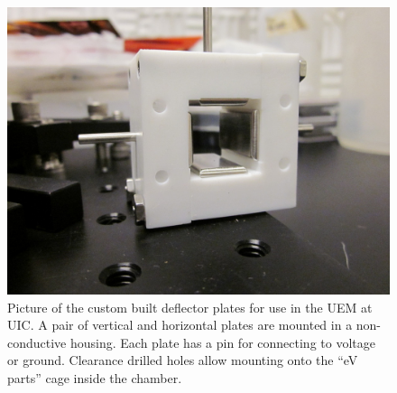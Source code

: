 \begin{figure}
  \centering
  \includegraphics{deflector_plates.jpg}
  \caption[Picture of custom deflector plates]{
    Picture of the custom built deflector plates for use in the UEM at UIC.
    A pair of vertical and horizontal plates are mounted in a non-conductive housing.
    Each plate has a pin for connecting to voltage or ground.
    Clearance drilled holes allow mounting onto the ``eV parts'' cage inside the chamber.
  }
  \label{fig:deflector-plates-pic}
\end{figure}
